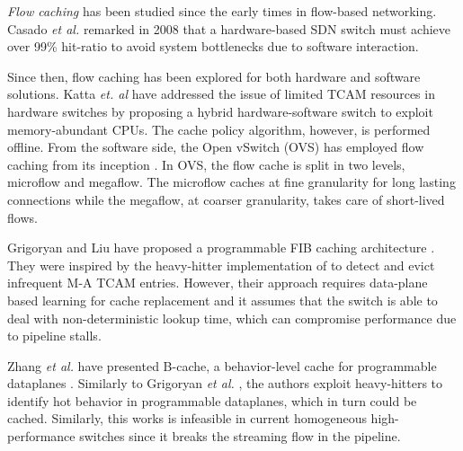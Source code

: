 
\textit{Flow caching} has been studied since the early times in flow-based networking. Casado \textit{et al.} \cite{casado:2008} remarked in 2008 that a hardware-based SDN switch must achieve over 99\% hit-ratio to avoid system bottlenecks due to software interaction.

Since then, flow caching has been explored for both hardware and software solutions. Katta \textit{et. al} \cite{Katta:2014,Katta:2016} have addressed the issue of limited TCAM resources in hardware switches by proposing a hybrid hardware-software switch to exploit memory-abundant CPUs. The cache policy algorithm, however, is performed offline. From the software side, the Open vSwitch (OVS) has employed flow caching from its inception \cite{Pfaff:15}. In OVS, the flow cache is split in two levels, microflow and megaflow. The microflow caches at fine granularity for long lasting connections while the megaflow, at coarser granularity, takes care of short-lived flows.


Grigoryan and Liu have proposed a programmable FIB caching architecture \cite{Grigoryan:18}. They were inspired by the heavy-hitter implementation of \cite{Sivaraman:17} to detect and evict infrequent M-A TCAM entries. However, their approach requires data-plane based learning for cache replacement and it assumes that the switch is able to deal with non-deterministic lookup time, which can compromise performance due to pipeline stalls. 

Zhang \textit{et al.} have presented B-cache, a behavior-level cache for programmable dataplanes \cite{Zhang:2018}. Similarly to Grigoryan \textit{et al.} \cite{Grigoryan:18}, the authors exploit heavy-hitters to identify hot behavior in programmable dataplanes, which in turn could be cached. Similarly, this works is infeasible in current homogeneous high-performance switches since it breaks the streaming flow in the pipeline.

